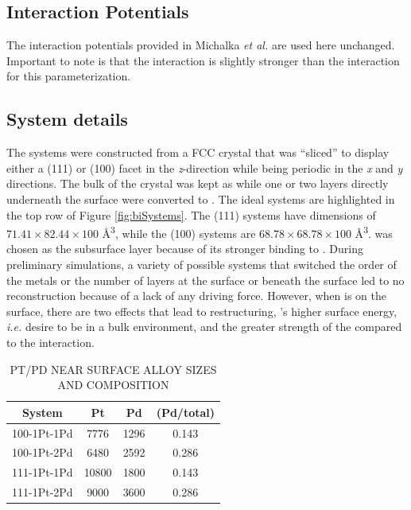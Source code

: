 \subsection{Interaction Potentials}
The interaction potentials provided in Michalka {\em et
al.}\citep{Michalka:2015aa} are used here unchanged. Important to note is that
the  interaction is slightly stronger than the
 interaction for this parameterization.

\subsection{System details}
The systems were constructed from a FCC  crystal that was ``sliced'' to
display either a (111) or (100) facet in the {\em z}-direction while being
periodic in the {\em x} and {\em y} directions. The bulk of the crystal was
kept as  while one or two layers directly underneath the surface were
converted to . The ideal systems are highlighted in the top row of
Figure \ref{fig:biSystems}. The (111) systems have dimensions of
$71.41\times82.44\times100$ \AA\textsuperscript{3}, while the (100) systems are
$68.78\times68.78\times100$ \AA\textsuperscript{3}.  was chosen as the
subsurface layer because of its stronger binding to . During preliminary
simulations, a variety of possible systems that switched the order of the
metals or the number of layers at the surface or beneath the surface led to no
reconstruction because of a lack of any driving force.  However, when 
is on the surface, there are two effects that lead to restructuring, 's
higher surface energy, {\em i.e.} desire to be in a bulk environment, and the
greater strength of the  compared to the 
interaction.

\begin{table}
  \caption{PT/PD NEAR SURFACE ALLOY SIZES AND COMPOSITION}
  \centering
  \begin{threeparttable}
  \begin{tabular}{ c ccc }
  \hline
  \hline
  \textbf{System} & \textbf{Pt} & \textbf{Pd} &  \textbf{(Pd/total)} \\
  \hline
  100-1Pt-1Pd & 7776 & 1296  & 0.143 \\
  100-1Pt-2Pd & 6480  & 2592  & 0.286 \\
  111-1Pt-1Pd & 10800  & 1800  & 0.143 \\
  111-1Pt-2Pd & 9000 & 3600  & 0.286 \\
  \hline
  \hline
  \end{tabular}
  \end{threeparttable}
\label{tab:systems1}
\end{table}


